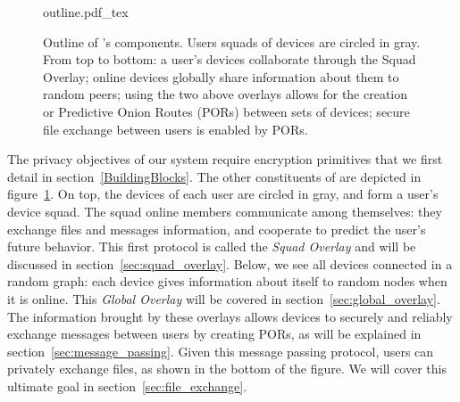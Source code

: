 \begin{figure}[t]
\centering
\def\svgwidth{\columnwidth}
%
{outline.pdf_tex}
\caption{\label{fig:outline}Outline of \name's components. Users squads of devices are circled in gray. From top to bottom: a user's devices collaborate through the Squad Overlay; online devices globally share information about them to random peers; using the two above overlays allows for the creation or Predictive Onion Routes (PORs) between sets of devices; secure file exchange between users is enabled by PORs.}
\end{figure}

The privacy objectives of our system require encryption primitives that we first detail in section~\ref{BuildingBlocks}. The other constituents of \name are depicted in figure~\ref{fig:outline}.
On top, the devices of each user are circled in gray, and form a user's device squad. The squad online members communicate among themselves: they exchange files and messages information, and cooperate to predict the user's future behavior. 
This first protocol is called the \emph{Squad Overlay} and will be discussed in section~\ref{sec:squad_overlay}.
Below, we see all devices connected in a random graph: each device gives information about itself to random nodes when it is online. 
This \emph{Global Overlay} will be covered in section~\ref{sec:global_overlay}.
The information brought by these overlays allows devices to securely and reliably exchange messages between users by creating PORs, as will be explained in section~\ref{sec:message_passing}.
Given this message passing protocol, users can privately exchange files, as shown in the bottom of the figure. We will cover this ultimate goal in section~\ref{sec:file_exchange}.






